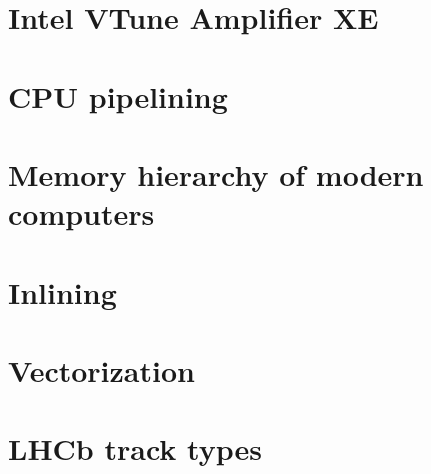 \documentclass[12pt]{article}
\begin{document}
\appendix

\newpage
\section{Intel VTune Amplifier XE}

\section{CPU pipelining}

\section{Memory hierarchy of modern computers}

\section{Inlining}

\section{Vectorization}

\section{LHCb track types}
\end{document}
